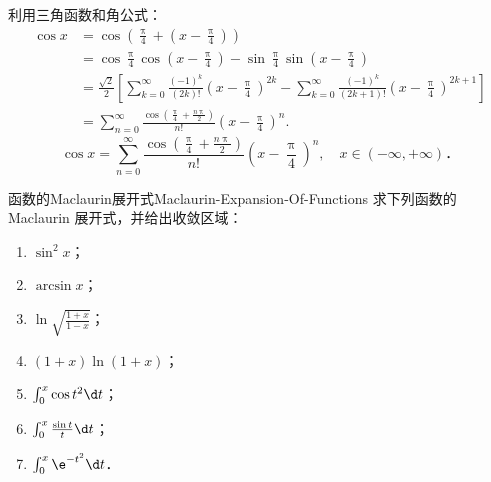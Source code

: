 \begin{solution}

    利用三角函数和角公式：
    \begin{equation}
        \begin{aligned}
            \cos x & = \cos\left( \frac{\uppi}{4} + \left(x - \frac{\uppi}{4}\right) \right)                                                                                                                           \\
                   & = \cos\frac{\uppi}{4} \cos\left(x - \frac{\uppi}{4}\right) - \sin\frac{\uppi}{4} \sin\left(x - \frac{\uppi}{4}\right)                                                                             \\
                   & = \frac{\sqrt{2}}{2} \left[ \sum_{k=0}^\infty \frac{(-1)^k}{(2k)!}\left(x - \frac{\uppi}{4}\right)^{2k} - \sum_{k=0}^\infty \frac{(-1)^k}{(2k+1)!}\left(x - \frac{\uppi}{4}\right)^{2k+1} \right] \\
                   & = \sum_{n=0}^\infty \frac{\cos\left(\frac{\uppi}{4} + \frac{n\uppi}{2}\right)}{n!} \left(x - \frac{\uppi}{4}\right)^n.
        \end{aligned}
    \end{equation}
    \begin{equation}
        \boxed{\cos x = \sum_{n=0}^\infty \frac{\cos\left(\frac{\uppi}{4} + \frac{n\uppi}{2}\right)}{n!} \left(x - \frac{\uppi}{4}\right)^n, \quad x \in (-\infty, +\infty)．}
    \end{equation}
\end{solution}

\begin{problem}{函数的Maclaurin展开式}{Maclaurin-Expansion-Of-Functions}
    求下列函数的 Maclaurin 展开式，并给出收敛区域：
    \begin{enumerate}
        \item $\sin^2 x$；
        \item $\arcsin x$；
        \item $\ln \sqrt{\frac{1 + x}{1 - x}}$；
        \item $(1 + x)\ln(1 + x)$；
        \item $\int_0^x \cos t^2 \d t$；
        \item $\int_0^x \frac{\sin t}{t} \d t$；
        \item $\int_0^x \e^{-t^2} \d t$．
    \end{enumerate}
\end{problem}

